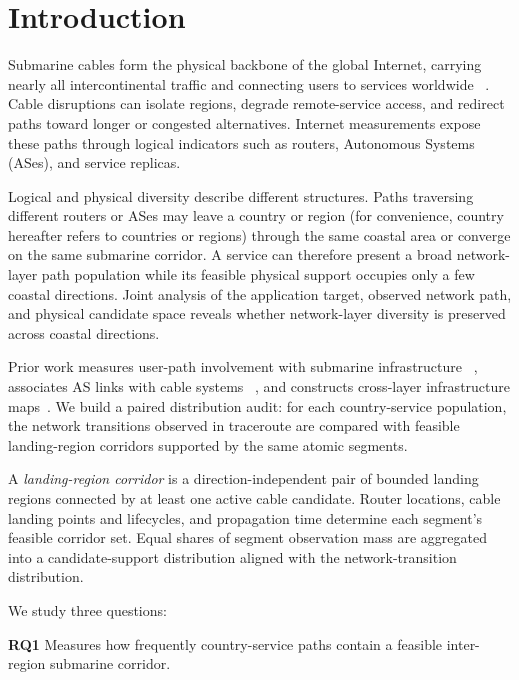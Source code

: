 \section{Introduction}
\label{sec:introduction}

Submarine cables form the physical backbone of the global Internet, carrying
nearly all intercontinental traffic and connecting users to services worldwide
~\cite{telegeography_submarine_map}. Cable disruptions can isolate regions,
degrade remote-service access, and redirect paths toward longer or congested
alternatives. Internet measurements expose these paths through logical
indicators such as routers, Autonomous Systems (ASes), and service replicas.

Logical and physical diversity describe different structures. Paths traversing
different routers or ASes may leave a country or region (for convenience, country hereafter refers to countries or regions) through the same coastal area or
converge on the same submarine corridor. A service can therefore present a
broad network-layer path population while its feasible physical support
occupies only a few coastal directions. Joint analysis of the application
target, observed network path, and physical candidate space reveals whether
network-layer diversity is preserved across coastal directions.

Prior work measures user-path involvement with submarine infrastructure
~\cite{liu2020outofsight}, associates AS links with cable systems
~\cite{ye2023impact,ramanathan2023nautilus,wang2025calypso}, and constructs
cross-layer infrastructure maps~\cite{durairajan2013atlas,anderson2022igdb}.
We build a paired distribution audit: for each country-service population, the
network transitions observed in traceroute are compared with feasible
landing-region corridors supported by the same atomic segments.

A \emph{landing-region corridor} is a direction-independent pair of bounded
landing regions connected by at least one active cable candidate. Router
locations, cable landing points and lifecycles, and propagation time determine
each segment's feasible corridor set. Equal shares of segment observation mass
are aggregated into a candidate-support distribution aligned with the
network-transition distribution.

We study three questions: 

\textbf{RQ1} Measures how frequently country-service paths contain a feasible inter-region submarine corridor.

